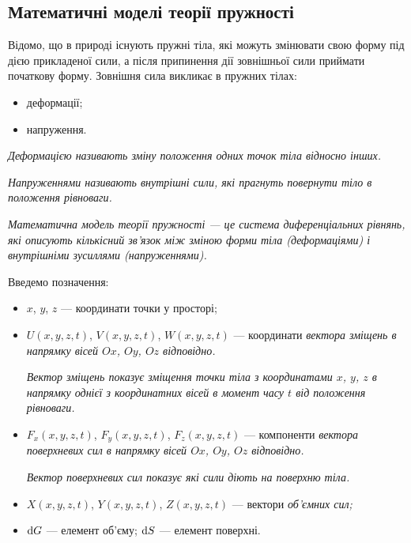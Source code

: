 \subsection{Математичні моделі теорії пружності}

Відомо, що в природі існують пружні тіла, які можуть змінювати свою форму під дією прикладеної сили, а після припинення дії зовнішньої сили приймати початкову форму. Зовнішня сила викликає в пружних тілах:
\begin{itemize}
	\item деформації;
	\item напруження.
\end{itemize}

\begin{definition}[деформації]
	\it{Деформацією} називають зміну положення одних точок тіла відносно інших.
\end{definition}

\begin{definition}[напружень]
	\it{Напруженнями} називають внутрішні сили, які прагнуть повернути тіло в положення рівноваги.
\end{definition}

\begin{definition}
	\it{Математична модель теорії пружності} --- це система диференціальних рівнянь, які описують кількісний зв'язок між зміною форми тіла (деформаціями) і внутрішніми зусиллями (напруженнями). 
\end{definition}

Введемо позначення:
\begin{itemize}
	\item $x$, $y$, $z$ --- координати точки у просторі;
 	\item $U(x, y, z, t)$, $V(x, y, z, t)$, $W(x, y, z, t)$ --- координати \it{вектора зміщень} в напрямку вісей $Ox$, $Oy$, $Oz$ відповідно. \smallskip

 	\begin{remark}
 		\it{Вектор зміщень} показує зміщення точки тіла з координатами $x$, $y$, $z$ в напрямку однієї з координатних вісей в момент часу $t$ від положення рівноваги.
 	\end{remark}

	\item $F_x(x, y, z, t)$, $F_y(x, y, z, t)$, $F_z(x, y, z, t)$ --- компоненти \it{вектора поверхневих сил} в напрямку вісей $Ox$, $Oy$, $Oz$ відповідно. \smallskip

	\begin{remark}
		\it{Вектор поверхневих сил} показує які сили діють на поверхню тіла.
	\end{remark}

	\item $X(x, y, z, t)$, $Y(x, y, z, t)$, $Z(x, y, z, t)$ --- вектори \it{об'ємних сил};
	
	\item $\mathop{}\!\mathrm{d} G$ --- елемент об'єму; $\mathop{}\!\mathrm{d} S$ --- елемент поверхні.
\end{itemize}

